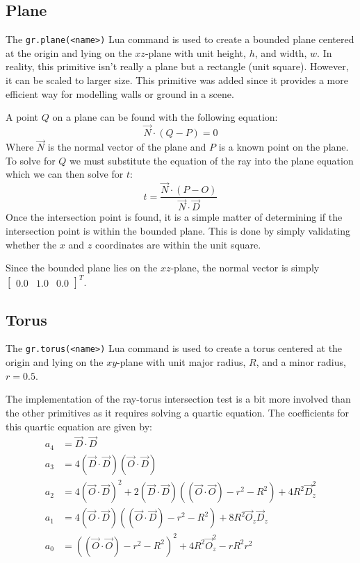 \subsection*{Plane}
The \verb|gr.plane(<name>)| Lua command is used to create a bounded plane 
centered at the origin and lying on the $xz$-plane with unit height, $h$, and 
width, $w$. In reality, this primitive isn't really a plane but a rectangle
(unit square). However, it can be scaled to larger size. This primitive was
added since it provides a more efficient way for modelling walls or ground in a
scene.

A point $Q$ on a plane can be found with the following equation:
\begin{equation}
  \vec{N}\cdot (Q - P) = 0
\end{equation}
Where $\vec{N}$ is the normal vector of the plane and $P$ is a known point on
the plane. To solve for $Q$ we must substitute the equation of the ray into the
plane equation which we can then solve for $t$:
\begin{equation}
  t = \frac{\vec{N}\cdot (P - O)}{\vec{N}\cdot \vec{D}}
\end{equation}
Once the intersection point is found, it is a simple matter of determining if
the intersection point is within the bounded plane. This is done by simply
validating whether the $x$ and $z$ coordinates are within the unit square.

Since the bounded plane lies on the $xz$-plane, the normal vector is simply
$\begin{bmatrix} 0.0 & 1.0 & 0.0
\end{bmatrix}^{T}$.

\subsection*{Torus}
The \verb|gr.torus(<name>)| Lua command is used to create a torus centered at
the origin and lying on the $xy$-plane with unit major radius, $R$, and a minor 
radius, $r = 0.5$.

The implementation of the ray-torus intersection test is a bit more involved
than the other primitives as it requires solving a quartic equation. The
coefficients for this quartic equation are given by:
\begin{equation}
\begin{split}
  a_{4} &= \vec{D}\cdot\vec{D} \\
  a_{3} &= 4(\vec{D}\cdot\vec{D})(\vec{O}\cdot\vec{D}) \\
  a_{2} &= 4(\vec{O}\cdot\vec{D})^2 + 2(\vec{D}\cdot\vec{D})((\vec{O}\cdot
  \vec{O}) - r^2 - R^2) + 4R^2\vec{D}_{z}^2 \\
  a_{1} &= 4(\vec{O}\cdot\vec{D})((\vec{O}\cdot\vec{D}) - r^2 - R^2) +8R^2
  \vec{O}_{z}\vec{D}_{z} \\
  a_{0} &= ((\vec{O}\cdot\vec{O}) - r^2 - R^2)^2 + 4R^2\vec{O}_{z}^2 - rR^2r^2
\end{split}
\end{equation}

